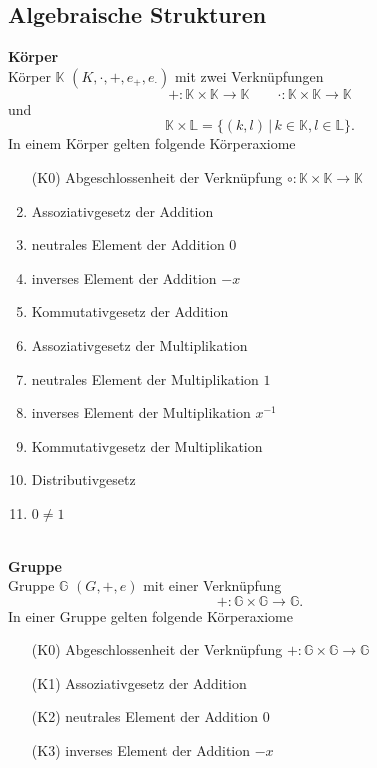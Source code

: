 \documentclass[a4paper,12pt]{article}
\numberwithin{equation}{section}
\begin{document}
\subsection{Algebraische Strukturen}
\textbf{Körper}\\ 
Körper $\mathbb{K}$ $\left( K,\cdot ,+,e_{+},e_{\cdot }\right) $ mit zwei Verknüpfungen
\[ 
+:\mathbb{K}\times \mathbb{K}\rightarrow \mathbb{K}\qquad \cdot :\mathbb{K}\times \mathbb{K}\rightarrow \mathbb{K}
\] 
und 
\[ 
        \mathbb{K}\times \mathbb{L}=\{\left( k,l\right) \,|\, k \in \mathbb{K},l \in \mathbb{L}\}
.\] 
In einem Körper gelten folgende Körperaxiome
\begin{enumerate}[wide,label=(K\arabic*)]
        \item [(K0)] Abgeschlossenheit der Verknüpfung $\circ:\mathbb{K}\times \mathbb{K}\rightarrow \mathbb{K}$ 
        \item Assoziativgesetz der Addition
        \item neutrales Element der Addition $0$
        \item inverses Element der Addition $-x$ 
        \item Kommutativgesetz der Addition
        \item Assoziativgesetz der Multiplikation
        \item neutrales Element der Multiplikation $1$ 
        \item inverses Element der Multiplikation $x^{-1}$ 
        \item Kommutativgesetz der Multiplikation
        \item Distributivgesetz
        \item $0\neq 1$ 
\end{enumerate}
\hfill\\\textbf{Gruppe}\\ 
Gruppe $\mathbb{G}$ $\left( G,+,e\right) $  mit einer Verknüpfung
\[ 
+:\mathbb{G}\times \mathbb{G}\rightarrow \mathbb{G}
.\] 
In einer Gruppe gelten folgende Körperaxiome
\begin{enumerate}[wide,label=]
        \item[(K0)] Abgeschlossenheit der Verknüpfung $+:\mathbb{G}\times \mathbb{G}\rightarrow \mathbb{G}$ 
        \item[(K1)] Assoziativgesetz der Addition
        \item[(K2)] neutrales Element der Addition $0$ 
        \item[(K3)] inverses Element der Addition $-x$ 
\end{enumerate}
\end{document}

